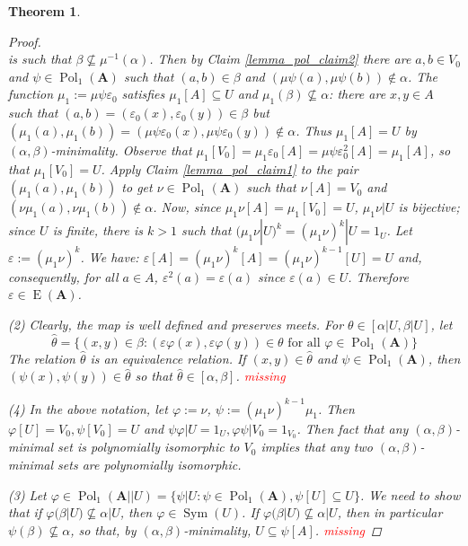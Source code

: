 \documentclass{amsart}
\theoremstyle{plain}
\newtheorem{theorem}{Theorem}[section]
\theoremstyle{definition}
\theoremstyle{remark}
\def\phi{\varphi}
\def\epsilon{\varepsilon}
\DeclareMathOperator{\Pol}{Pol}
\DeclareMathOperator{\Sym}{Sym}
\DeclareMathOperator{\Id}{E}
\begin{document}
\begin{theorem}
\begin{proof}
\begin{equation*}
        \end{equation*}
        is such that $\beta \nsubseteq \mu^{-1}(\alpha)$. 
        Then by Claim \ref{lemma_pol_claim2} there are $a,b \in V_0$ and $\psi \in \Pol_1(\mathbf{A})$ such that $(a,b) \in \beta$ and $(\mu \psi(a), \mu \psi(b)) \notin \alpha$. 
        The function $\mu_1:=\mu \psi \epsilon_0$ satisfies $\mu_1[A] \subseteq U$ and $\mu_1(\beta) \nsubseteq \alpha$: 
        there are $x,y \in A$ such that $(a,b)=(\epsilon_0(x), \epsilon_0(y)) \in \beta $ but $(\mu_1(a), \mu_1(b))=(\mu \psi \epsilon_0(x), \mu \psi \epsilon_0(y)) \notin \alpha$. 
        Thus $\mu_1[A] = U$ by $(\alpha, \beta)$-minimality. 
        Observe that $\mu_1[V_0]=\mu_1 \epsilon_0 [A] = \mu \psi \epsilon^2_0[A] = \mu_1[A]$, so that $\mu_1[V_0] = U$. 
        Apply Claim \ref{lemma_pol_claim1} to the pair $(\mu_1(a), \mu_1(b))$ to get $\nu \in \Pol_1(\mathbf{A})$ such that $\nu[A]=V_0$ and $(\nu \mu_1(a), \nu \mu_1(b)) \notin \alpha$. 
        Now, since $\mu_1 \nu [A] = \mu_1[V_0] = U$, 
        $\mu_1 \nu | U $ is bijective; since $U$ is finite, there is $k >1$ such that $(\mu_1 \nu |U )^k = (\mu_1 \nu)^k |U =1_U$. 
        Let $\epsilon:=(\mu_1 \nu)^k$.
        We have: $\epsilon[A] = (\mu_1 \nu)^k[A]=(\mu_1 \nu)^{k-1}[U]=U$ and, consequently, for all $a \in A$, $\epsilon^2(a)=\epsilon(a)$ since $\epsilon(a) \in U$. 
        Therefore $\epsilon \in \Id(\mathbf{A})$. 

        (2) Clearly, the map is well defined and preserves meets. 
        For $\theta \in [\alpha|U, \beta|U]$, let 
        \begin{equation*}
            \hat{\theta}=\{(x,y) \in \beta : (\epsilon \phi(x), \epsilon \phi(y)) \in \theta \text{ for all } \phi \in \Pol_1(\mathbf{A})\}
        \end{equation*}
        The relation $\hat{\theta}$ is an equivalence relation.
        If $(x,y) \in \hat{\theta}$ and $\psi \in \Pol_1(\mathbf{A})$, then $(\psi(x),\psi(y)) \in \hat{\theta}$ so that $\hat{\theta} \in [\alpha, \beta]$. 
        \textcolor{red}{missing}

        (4) In the above notation, let $\phi:=\nu$, $\psi:=(\mu_1 \nu)^{k-1} \mu_1$. 
        Then $\phi[U] = V_0, \psi[V_0]=U$ and $\psi \phi | U = 1_U, \phi \psi | V_0 = 1_{V_0}$. 
        Then fact that any $(\alpha, \beta)$-minimal set is polynomially isomorphic to $V_0$ implies that any two $(\alpha, \beta)$-minimal sets are polynomially isomorphic. 

        (3) Let $\phi \in \Pol_1(\mathbf{A}||U)=\{\psi|U : \psi \in \Pol_1(\mathbf{A}), \psi[U] \subseteq U\}$. 
        We need to show that if $\phi(\beta | U) \nsubseteq \alpha|U$, then $\phi \in \Sym(U)$. 
        If $\phi(\beta | U) \nsubseteq \alpha|U$, then in particular $\psi(\beta) \nsubseteq \alpha$, so that, by $(\alpha,\beta)$-minimality, $U \subseteq \psi[A]$. 
        \textcolor{red}{missing}
    \end{proof}
\end{theorem}
\end{document}
